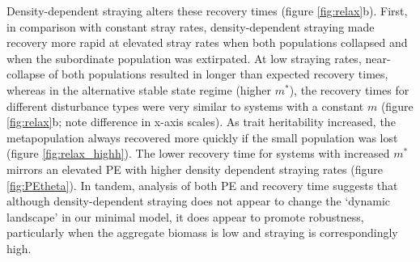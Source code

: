 \documentclass[twocolumn,preprintnumbers,amsmath,amssymb,superscriptaddress]{revtex4}
\begin{document}
Density-dependent straying alters these recovery times (figure \ref{fig:relax}b). 
First, in comparison with constant stray rates, density-dependent straying made recovery more rapid at elevated stray rates when both populations collapsed and when the subordinate population was extirpated.
At low straying rates, near-collapse of both populations resulted in longer than expected recovery times, whereas in the alternative stable state regime (higher $m^*$), the recovery times for different disturbance types were very similar to systems with a constant $m$ (figure \ref{fig:relax}b; note difference in x-axis scales).
As trait heritability increased, the metapopulation always recovered more quickly if the small population was lost (figure \ref{fig:relax_highh}).
The lower recovery time for systems with increased $m^*$ mirrors an elevated PE with higher density dependent straying rates (figure \ref{fig:PEtheta}).
In tandem, analysis of both PE and recovery time suggests that although density-dependent straying does not appear to change the `dynamic landscape' in our minimal model, it does appear to promote robustness, particularly when the aggregate biomass is low and straying is correspondingly high.
\end{document}
